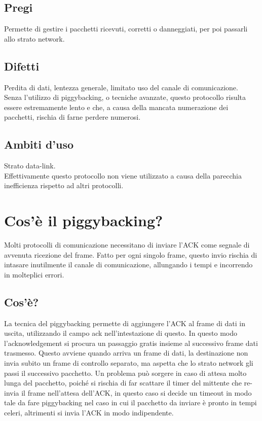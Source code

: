 \subsection{Pregi}
Permette di gestire i pacchetti ricevuti, corretti o danneggiati, per poi passarli allo strato network.

\subsection{Difetti}
Perdita di dati, lentezza generale, limitato uso del canale di comunicazione.\\
Senza l'utilizzo di piggybacking, o tecniche avanzate, questo protocollo risulta essere estremamente lento e che, a causa della mancata numerazione dei pacchetti, rischia di farne perdere numerosi.


\subsection{Ambiti d'uso}
Strato data-link.\\
Effettivamente questo protocollo non viene utilizzato a causa della parecchia inefficienza rispetto ad altri protocolli.


\section{Cos'è il piggybacking?}

Molti protocolli di comunicazione necessitano di inviare l'ACK come segnale di avvenuta ricezione del frame.
Fatto per ogni singolo frame, questo invio rischia di intasare inutilmente il canale di comunicazione, allungando i tempi e incorrendo in molteplici errori.

\subsection{Cos'è?}
La tecnica del piggybacking permette di aggiungere l'ACK al frame di dati in uscita, utilizzando il campo ack nell'intestazione di questo. In questo modo l'acknowledgement si procura un passaggio gratis insieme al successivo frame dati trasmesso.
Questo avviene quando arriva un frame di dati, la destinazione non invia subito un frame di controllo separato, ma aspetta che lo strato network gli passi il successivo pacchetto.
Un problema può sorgere in caso di attesa molto lunga del pacchetto, poiché si rischia di far scattare il timer del mittente che re-invia il frame nell'attesa dell'ACK, in questo caso si decide un timeout in modo tale da fare piggybacking nel caso in cui il pacchetto da inviare è pronto in tempi celeri, altrimenti si invia l'ACK in modo indipendente.

